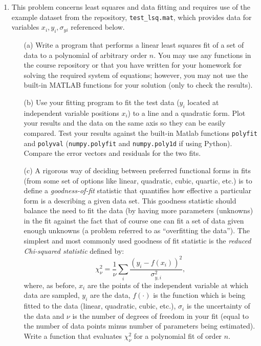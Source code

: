\documentclass{article}
\begin{document}
\pagebreak

\begin{enumerate}
  \item This problem concerns least squares and data fitting and requires use of the example dataset from the repository, \texttt{test\_lsq.mat}, which provides data for variables $x_i,y_i,\sigma_{yi}$ referenced below.  
  \begin{itemize}
    \item[(a)] Write a program that performs a linear least squares fit of a set of data to a polynomial of arbitrary order $n$.  You may use any functions in the course repository or that you have written for your homework for solving the required system of equations; however, you may not use the built-in MATLAB functions for your solution (only to check the results).  
    \item[(b)] Use your fitting program to fit the test data ($y_i$ located at independent variable positions $x_i$) to a line and a quadratic form.  Plot your results and the data on the same axis so they can be easily compared.  Test your results against the built-in Matlab functions \texttt{polyfit} and \texttt{polyval} (\texttt{numpy.polyfit} and \texttt{numpy.poly1d} if using Python).  Compare the error vectors and residuals for the two fits.  
    \item[(c)] A rigorous way of deciding between preferred functional forms in fits (from some set of options like linear, quadratic, cubic, quartic, etc.) is to define a \emph{goodness-of-fit} statistic that quantifies how effective a particular form is a describing a given data set.  This goodness statistic should balance the need to fit the data (by having more parameters (unknowns) in the fit against the fact that of course one can fit a set of data given enough unknowns (a problem referred to as ``overfitting the data'').  The simplest and most commonly used goodness of fit statistic is the \emph{reduced Chi-squared statistic} defined by:  
    \begin{equation}
      \chi^2_\nu = \frac{1}{\nu} \sum_i \frac{\left( y_i - f(x_i) \right) ^2}{\sigma_{y,i}^2},
    \end{equation}
    where, as before, $x_i$ are the points of the independent variable at which data are sampled, $y_i$ are the data, $f(\cdot)$ is the function which is being fitted to the data (linear, quadratic, cubic, etc.), $\sigma_i$ is the uncertainty of the data and $\nu$ is the number of degrees of freedom in your fit (equal to the number of data points minus number of parameters being estimated).  Write a function that evaluates $\chi^2_\nu$ for a polynomial fit of order $n$.  

\end{itemize}
\end{enumerate}
\end{document}
